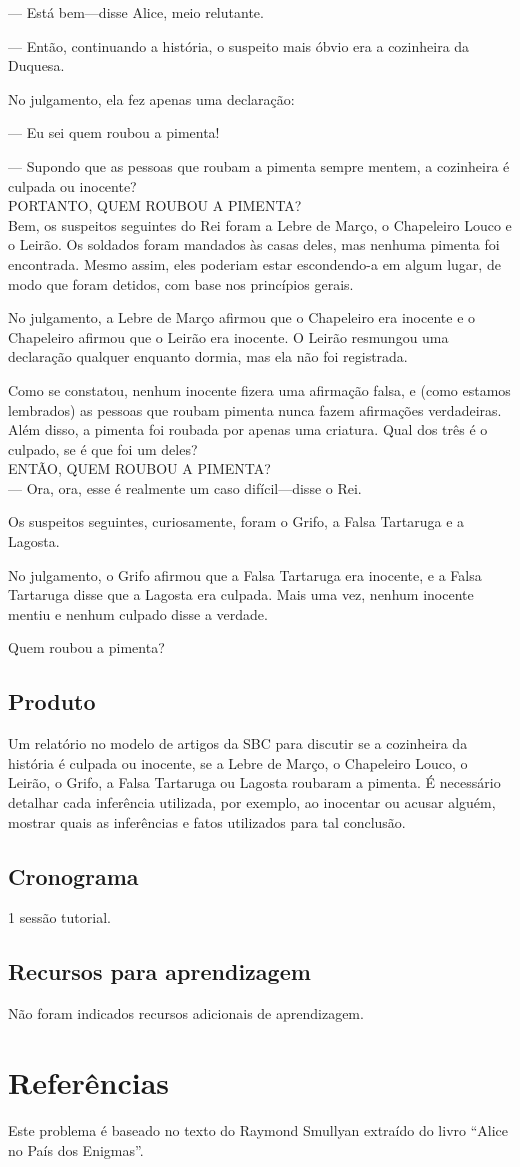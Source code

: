 --- Está bem---disse Alice, meio relutante.

--- Então, continuando a história, o suspeito mais óbvio era a cozinheira da Duquesa.

No julgamento, ela fez apenas uma declaração:

--- Eu sei quem roubou a pimenta!

--- Supondo que as pessoas que roubam a pi\-men\-ta sempre mentem, a cozinheira é culpada ou inocente?\\

PORTANTO, QUEM ROUBOU A PIMENTA?\\

Bem, os suspeitos seguintes do Rei foram a Lebre de Março, o Chapeleiro Louco e o Leirão. Os soldados foram mandados às casas deles, mas nenhuma pimenta foi encontrada. Mesmo assim, eles poderiam estar escondendo-a em algum lugar, de modo que foram detidos, com base nos princípios gerais.

No julgamento, a Lebre de Março afirmou que o Chapeleiro era inocente e o Chapeleiro afirmou que o Leirão era inocente. O Leirão resmungou uma declaração qualquer enquanto dormia, mas ela não foi registrada.

Como se constatou, nenhum inocente fizera uma afirmação falsa, e (como estamos lembrados) as pessoas que roubam pimenta nunca fazem afirmações verdadeiras. Além disso, a pimenta foi roubada por apenas uma criatura. Qual dos três é o culpado, se é que foi um deles?\\

ENTÃO, QUEM ROUBOU A PIMENTA?\\

--- Ora, ora, esse é realmente um caso difícil---disse o Rei.

Os suspeitos seguintes, curiosamente, foram o Grifo, a Falsa Tartaruga e a Lagosta.

No julgamento, o Grifo afirmou que a Falsa Tartaruga era inocente, e a Falsa Tartaruga disse que a Lagosta era culpada.
Mais uma vez, nenhum inocente mentiu e nenhum culpado disse a verdade.

Quem roubou a pimenta?

\subsection{Produto}
Um relatório no modelo de artigos da SBC para discutir se a cozinheira da história é culpada ou
inocente, se a Lebre de Março, o Chapeleiro Louco, o Leirão, o Grifo, a Falsa Tartaruga ou Lagosta
roubaram a pimenta.
É necessário detalhar cada inferência utilizada, por exemplo, ao inocentar ou acusar alguém, mostrar
quais as inferências e fatos utilizados para tal conclusão.

\subsection{Cronograma}
1 sessão tutorial.

\subsection{Recursos para aprendizagem}
Não foram indicados recursos adicionais de aprendizagem.

\section*{Referências}
Este problema é baseado no texto do Raymond Smullyan extraído do livro ``Alice no País dos Enigmas''.

